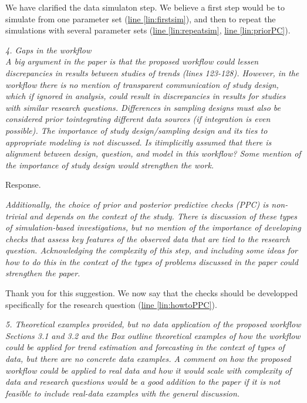 \documentclass[11pt,letter]{article}
\begin{document}
We have clarified the data simulaton step. We believe a first step would be to simulate from one parameter set (\href{file:forecastflows_r1\#lintarget:firstsim}{line \ref*{lin:firstsim}}), and then to repeat the simulations with several parameter sets (\href{file:forecastflows_r1\#lintarget:repeatsim}{line \ref*{lin:repeatsim}}, \href{file:forecastflows_r1\#lintarget:priorPC}{line \ref*{lin:priorPC}}).

\begin{mybox}
\emph{4. Gaps in the workflow\\
A big argument in the paper is that the proposed workflow could lessen discrepancies in results between studies of trends (lines 123-128). However, in the workflow there is no mention of transparent communication of study design, which if ignored in analysis, could result in discrepancies in results for studies with similar research questions. Differences in sampling designs must also be considered prior tointegrating different data sources (if integration is even possible). The importance of study design/sampling design and its ties to appropriate modeling is not discussed. Is itimplicitly assumed that there is alignment between design, question, and model in this workflow? Some mention of the importance of study design would strengthen the work.}
\end{mybox}

Response.

\begin{mybox}
\emph{Additionally, the choice of prior and posterior predictive checks (PPC) is non-trivial and depends on the context of the study. There is discussion of these types of simulation-based investigations, but no mention of the importance of developing checks that assess key features of the observed data that are tied to the research question. Acknowledging the complexity of this step, and including some ideas for how to do this in the context of the types of problems discussed in the paper could strengthen the paper.}
\end{mybox}

Thank you for this suggestion. We now say that the checks should be developped specifically for the research question (\href{file:forecastflows_r1\#lintarget:howtoPPC}{line \ref*{lin:howtoPPC}}). 

\begin{mybox}
\emph{5. Theoretical examples provided, but no data application of the proposed workflow\\
Sections 3.1 and 3.2 and the Box outline theoretical examples of how the workflow could be applied for trend estimation and forecasting in the context of types of data, but there are no concrete data examples. A comment on how the proposed workflow could be applied to real data and how it would scale with complexity of data and research questions would be a good addition to the paper if it is not feasible to include real-data examples with the general discussion.}
\end{mybox}
\end{document}
